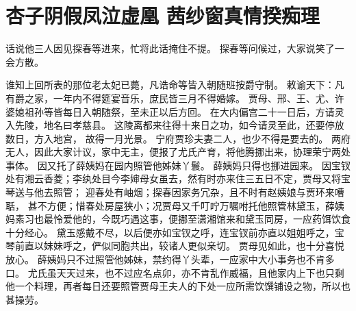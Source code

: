 \chapter{杏子阴假凤泣虚凰 \quad 茜纱窗真情揆痴理}
\par
{}\par
话说他三人因见探春等进来，忙将此话掩住不提。
探春等问候过，大家说笑了一会方散。
\par
谁知上回所表的那位老太妃已薨，凡诰命等皆入朝随班按爵守制。
敕谕天下：凡有爵之家，一年内不得筵宴音乐，庶民皆三月不得婚嫁。
贾母、邢、王、尤、许婆媳祖孙等皆每日入朝随祭，至未正以后方回。
在大内偏宫二十一日后，方请灵入先陵，地名曰孝慈县。
这陵离都来往得十来日之功，如今请灵至此，还要停放数日，方入地宫，
故得一月光景。
宁府贾珍夫妻二人，也少不得是要去的。
两府无人，因此大家计议，家中无主，便报了尤氏产育，将他腾挪出来，协理荣宁两处事体。
因又托了薛姨妈在园内照管他姊妹丫鬟。
薛姨妈只得也挪进园来。
因宝钗处有湘云香菱；李纨处目今李婶母女虽去，然有时亦来住三五日不定，贾母又将宝琴送与他去照管；
迎春处有岫烟；探春因家务冗杂，且不时有赵姨娘与贾环来嘈聒，
甚不方便；惜春处房屋狭小；况贾母又千叮咛万嘱咐托他照管林黛玉，薛姨妈素习也最怜爱他的，今既巧遇这事，便挪至潇湘馆来和黛玉同房，一应药饵饮食十分经心。
黛玉感戴不尽，以后便亦如宝钗之呼，连宝钗前亦直以姐姐呼之，宝琴前直以妹妹呼之，俨似同胞共出，较诸人更似亲切。
贾母见如此，也十分喜悦放心。
薛姨妈只不过照管他姊妹，禁约得丫头辈，一应家中大小事务也不肯多口。
尤氏虽天天过来，也不过应名点卯，亦不肯乱作威福，且他家内上下也只剩他一个料理，再者每日还要照管贾母王夫人的下处一应所需饮馔铺设之物，所以也甚操劳。
